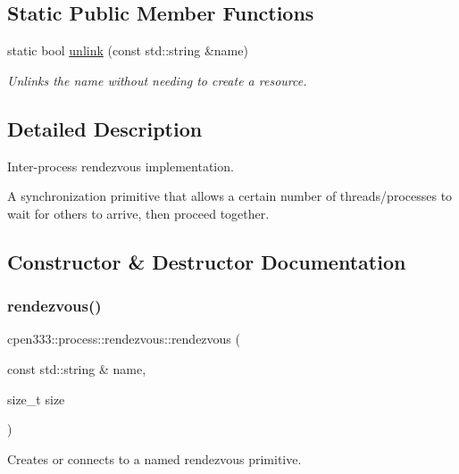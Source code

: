 \subsection*{Static Public Member Functions}
\begin{DoxyCompactItemize}
\item 
static bool \hyperlink{classcpen333_1_1process_1_1rendezvous_afc91e654e867c785656182d1b4adc360}{unlink} (const std\+::string \&name)
\begin{DoxyCompactList}\small\item\em Unlinks the name without needing to create a resource. \end{DoxyCompactList}\end{DoxyCompactItemize}


\subsection{Detailed Description}
Inter-\/process rendezvous implementation. 

A synchronization primitive that allows a certain number of threads/processes to wait for others to arrive, then proceed together. 

\subsection{Constructor \& Destructor Documentation}
\mbox{\label{classcpen333_1_1process_1_1rendezvous_a616069d02e03b2b33c7e10e730f084a0}} 
\subsubsection{\texorpdfstring{rendezvous()}{rendezvous()}}
{\footnotesize\ttfamily cpen333\+::process\+::rendezvous\+::rendezvous (\begin{DoxyParamCaption}\item[{const std\+::string \&}]{name,  }\item[{size\+\_\+t}]{size }\end{DoxyParamCaption})\hspace{0.3cm}{\ttfamily [inline]}}



Creates or connects to a named rendezvous primitive. 


